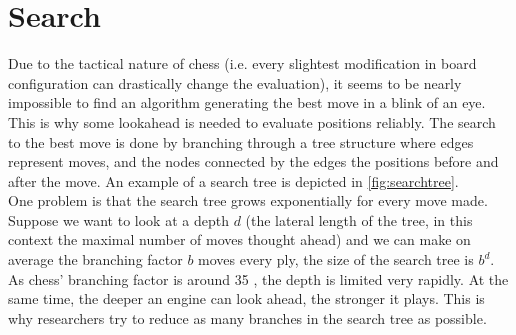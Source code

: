\section{Search}
\label{sec:search}
Due to the tactical nature of chess (i.e. every slightest modification in board configuration can drastically change the evaluation), it seems to be nearly impossible to find an algorithm generating the best move in a blink of an eye. This is why some lookahead is needed to evaluate positions reliably. The search to the best move is done by branching through a tree structure where edges represent moves, and the nodes connected by the edges the positions before and after the move. An example of a search tree is depicted in \ref{fig:searchtree}. \\
One problem is that the search tree grows exponentially for every move made. Suppose we want to look at a depth $d$ (the lateral length of the tree, in this context the maximal number of moves thought ahead) and we can make on average the branching factor $b$ moves every ply, the size of the search tree is $b^{d}$. As chess' branching factor is around 35 \cite{levin14}, the depth is limited very rapidly. At the same time, the deeper an engine can look ahead, the stronger it plays. This is why researchers try to reduce as many branches in the search tree as possible.

%
%
%

